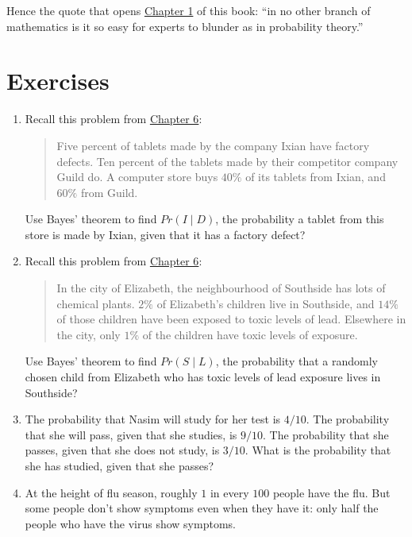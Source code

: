 \documentclass[justified]{tufte-book}
\newcommand{\given}{\mid}
\newcommand{\p}{Pr}
\theoremstyle{definition}
\theoremstyle{definition}
\theoremstyle{definition}
\theoremstyle{remark}
\begin{document}
Hence the quote that opens
\protect\hyperlink{the-monty-hall-problem}{Chapter 1} of this book: ``in
no other branch of mathematics is it so easy for experts to blunder as
in probability theory.''

\hypertarget{exercises-6}{%
\section*{Exercises}\label{exercises-6}}

\begin{enumerate}
\item
  Recall this problem from \protect\hyperlink{ch6ex}{Chapter 6}:

  \begin{quote}
  Five percent of tablets made by the company Ixian have factory
  defects. Ten percent of the tablets made by their competitor company
  Guild do. A computer store buys \(40\%\) of its tablets from Ixian,
  and \(60\%\) from Guild.
  \end{quote}

  Use Bayes' theorem to find \(\p(I \given D)\), the probability a
  tablet from this store is made by Ixian, given that it has a factory
  defect?
\item
  Recall this problem from \protect\hyperlink{ch6ex}{Chapter 6}:

  \begin{quote}
  In the city of Elizabeth, the neighbourhood of Southside has lots of
  chemical plants. \(2\%\) of Elizabeth's children live in Southside,
  and \(14\%\) of those children have been exposed to toxic levels of
  lead. Elsewhere in the city, only \(1\%\) of the children have toxic
  levels of exposure.
  \end{quote}

  Use Bayes' theorem to find \(\p(S \given L)\), the probability that a
  randomly chosen child from Elizabeth who has toxic levels of lead
  exposure lives in Southside?
\item
  The probability that Nasim will study for her test is \(4/10\). The
  probability that she will pass, given that she studies, is \(9/10\).
  The probability that she passes, given that she does not study, is
  \(3/10\). What is the probability that she has studied, given that she
  passes?
\item
  At the height of flu season, roughly \(1\) in every \(100\) people
  have the flu. But some people don't show symptoms even when they have
  it: only half the people who have the virus show symptoms.


\end{enumerate}
\end{document}
